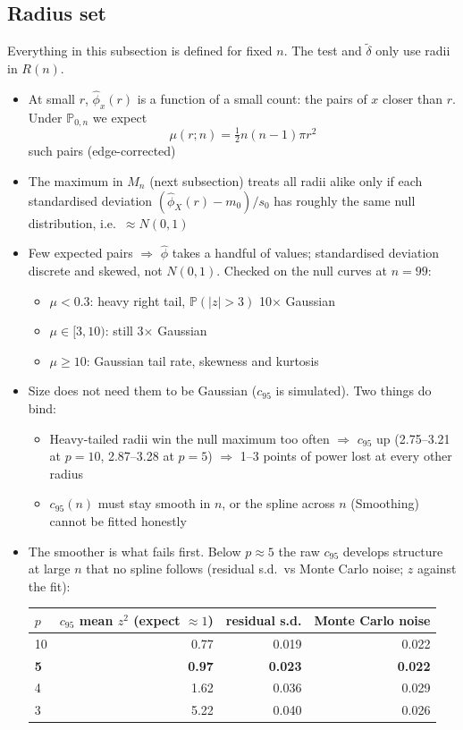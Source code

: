 \documentclass[11pt]{article}
\newcommand{\dt}{\tilde\delta}
\begin{document}
\subsection*{Radius set}
Everything in this subsection is defined for fixed $n$. The test and $\dt$ only use radii in $R(n)$.
\begin{itemize}
  \item At small $r$, $\hat\phi_x(r)$ is a function of a small count: the pairs of $x$ closer than $r$. Under $\mathbb P_{0,n}$ we expect
  \[
    \mu(r;n) = \tfrac12 n(n-1)\pi r^2
  \]
  such pairs (edge-corrected)
  \item The maximum in $M_n$ (next subsection) treats all radii alike only if each standardised deviation $(\hat\phi_X(r) - m_0)/s_0$ has roughly the same null distribution, i.e.\ $\approx N(0,1)$
  \item Few expected pairs $\Rightarrow$ $\hat\phi$ takes a handful of values; standardised deviation discrete and skewed, not $N(0,1)$. Checked on the null curves at $n=99$:
  \begin{itemize}
    \item $\mu < 0.3$: heavy right tail, $\mathbb P(|z|>3)$ 10$\times$ Gaussian
    \item $\mu \in [3, 10)$: still 3$\times$ Gaussian
    \item $\mu \ge 10$: Gaussian tail rate, skewness and kurtosis
  \end{itemize}
  \item Size does not need them to be Gaussian ($c_{95}$ is simulated). Two things do bind:
  \begin{itemize}
    \item Heavy-tailed radii win the null maximum too often $\Rightarrow$ $c_{95}$ up (2.75--3.21 at $p=10$, 2.87--3.28 at $p=5$) $\Rightarrow$ 1--3 points of power lost at every other radius
    \item $c_{95}(n)$ must stay smooth in $n$, or the spline across $n$ (Smoothing) cannot be fitted honestly
  \end{itemize}
  \item The smoother is what fails first. Below $p\approx5$ the raw $c_{95}$ develops structure at large $n$ that no spline follows (residual s.d.\ vs Monte Carlo noise; $z$ against the fit):

  \smallskip
  \begin{tabular}{@{}lrrr@{}}
  \toprule
  $p$ & $c_{95}$ mean $z^2$ (expect $\approx1$) & residual s.d. & Monte Carlo noise \\
  \midrule
  10 & 0.77 & 0.019 & 0.022 \\
  \textbf{5} & \textbf{0.97} & \textbf{0.023} & \textbf{0.022} \\
  4 & 1.62 & 0.036 & 0.029 \\
  3 & 5.22 & 0.040 & 0.026 \\
  \bottomrule
  \end{tabular}


\end{itemize}
\end{document}
